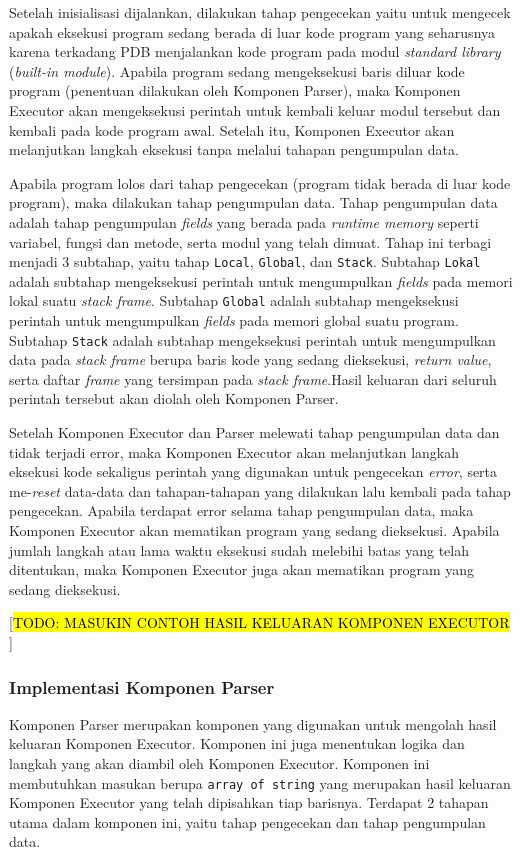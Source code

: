 Setelah inisialisasi dijalankan, dilakukan tahap pengecekan yaitu untuk mengecek apakah eksekusi program sedang berada di luar kode program yang seharusnya karena terkadang PDB menjalankan kode program pada modul \textit{standard library} (\textit{built-in module}). Apabila program sedang mengeksekusi baris diluar kode program (penentuan dilakukan oleh Komponen Parser), maka Komponen Executor akan mengeksekusi perintah untuk kembali keluar modul tersebut dan kembali pada kode program awal. Setelah itu, Komponen Executor akan melanjutkan langkah eksekusi tanpa melalui tahapan pengumpulan data.

Apabila program lolos dari tahap pengecekan (program tidak berada di luar kode program), maka dilakukan tahap pengumpulan data. Tahap pengumpulan data adalah tahap pengumpulan \textit{fields} yang berada pada \textit{runtime memory} seperti variabel, fungsi dan metode, serta modul yang telah dimuat. Tahap ini terbagi menjadi 3 subtahap, yaitu tahap \verb|Local|, \verb|Global|, dan \verb|Stack|. Subtahap \verb|Lokal| adalah subtahap mengeksekusi perintah untuk mengumpulkan \textit{fields} pada memori lokal suatu \textit{stack frame}. Subtahap \verb|Global| adalah subtahap mengeksekusi perintah untuk mengumpulkan \textit{fields} pada memori global suatu program. Subtahap \verb|Stack| adalah subtahap mengeksekusi perintah untuk mengumpulkan data pada \textit{stack frame} berupa baris kode yang sedang dieksekusi, \textit{return value}, serta daftar \textit{frame} yang tersimpan pada \textit{stack frame}.Hasil keluaran dari seluruh perintah tersebut akan diolah oleh Komponen Parser.

Setelah Komponen Executor dan Parser melewati tahap pengumpulan data dan tidak terjadi error, maka Komponen Executor akan melanjutkan langkah eksekusi kode sekaligus perintah yang digunakan untuk pengecekan \textit{error}, serta me-\textit{reset} data-data dan tahapan-tahapan yang dilakukan lalu kembali pada tahap pengecekan. Apabila terdapat error selama tahap pengumpulan data, maka Komponen Executor akan mematikan program yang sedang dieksekusi. Apabila jumlah langkah atau lama waktu eksekusi sudah melebihi batas yang telah ditentukan, maka Komponen Executor juga akan mematikan program yang sedang dieksekusi.

  [\hl{TODO: MASUKIN CONTOH HASIL KELUARAN KOMPONEN EXECUTOR }]

\subsubsection{Implementasi Komponen Parser}
Komponen Parser merupakan komponen yang digunakan untuk mengolah hasil keluaran Komponen Executor. Komponen ini juga menentukan logika dan langkah yang akan diambil oleh Komponen Executor. Komponen ini membutuhkan masukan berupa \verb|array of string| yang merupakan hasil keluaran Komponen Executor yang telah dipisahkan tiap barisnya. Terdapat 2 tahapan utama dalam komponen ini, yaitu tahap pengecekan dan tahap pengumpulan data.

